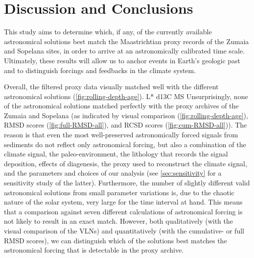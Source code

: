 \documentclass[]{agujournal2019}
\newcommand{\ijk}{\textcolor{blue}}
\begin{document}
\section{Discussion and Conclusions}\label{sec:discussion}

This study aims to determine which, if any, of the currently available astronomical solutions best match the Maastrichtian proxy records of the Zumaia and Sopelana sites, in order to arrive at an astronomically calibrated time scale.
Ultimately, these results will allow us to anchor events in Earth's geologic past and to distinguish forcings and feedbacks in the climate system.

Overall, the filtered proxy data visually matched well with the different astronomical solutions (\cref{fig:rolling-depth-age}).
 \gls{L*}  \gls{d13C}  \gls{MS} 
Unsurprisingly, none of the astronomical solutions matched perfectly with the proxy archives of the Zumaia and Sopelana  (as indicated by visual comparison (\cref{fig:rolling-depth-age}), \gls{RMSD} scores (\cref{fig:full-RMSD-all}), and \gls{RCSD} scores (\cref{fig:cum-RMSD-all})).
The reason is that even the most well-preserved astronomically forced signals from sediments do not reflect only astronomical forcing, but also a combination of the climate signal, the paleo-environment, the lithology that records the signal deposition, effects of diagenesis, the proxy used to reconstruct the climate signal, and the parameters and choices of our analysis (see \ref{sec:sensitivity} for a sensitivity study of the latter).
Furthermore, the number of slightly different valid astronomical solutions from small parameter variations is, due to the chaotic nature of the solar system, very large for the time interval at hand.
This means that a comparison against seven different calculations of astronomical forcing is not likely to result in an exact match.
However, both qualitatively (with the visual comparison of the \glspl{VLN}) and quantitatively (with the cumulative- or full \gls{RMSD} scores), we can distinguish which of the solutions best matches the astronomical forcing that is detectable in the proxy archive.
\end{document}
